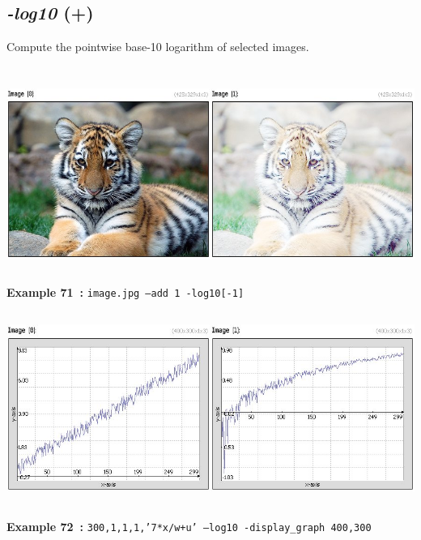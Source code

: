 \documentclass[a4paper,11pt,twoside]{book}
\begin{document}
\subsection{\emph{-log10} (+)}\vspace*{-0.5em}
Compute the pointwise base-10 logarithm of selected images.
\begin{center}\includegraphics[keepaspectratio=true,height=7cm,width=\textwidth]{img/gmic_def71.jpg}\\
{\footnotesize \textbf{Example 71~:} \texttt{image.jpg --add 1 -log10[-1]}}
\\\includegraphics[keepaspectratio=true,height=7cm,width=\textwidth]{img/gmic_def72.jpg}\\
{\footnotesize \textbf{Example 72~:} \texttt{300,1,1,1,'7*x/w+u' --log10 -display\_graph 400,300}}
\end{center}
\end{document}
